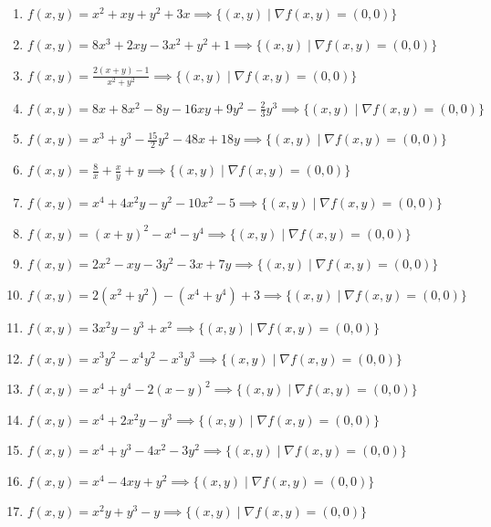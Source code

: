 \documentclass[11pt,a4paper]{article}
\begin{document}
\begin{enumerate}
\item $\displaystyle f(x, y) = x^{2} + xy + y^{2} + 3x \implies \{(x, y) \mid \nabla f(x, y) = (0, 0)\}$
\item $\displaystyle f(x, y) = 8x^{3} + 2xy - 3x^{2} + y^{2} + 1 \implies \{(x, y) \mid \nabla f(x, y) = (0, 0)\}$
\item $\displaystyle f(x, y) = \frac{2(x + y) - 1}{x^{2} + y^{2}} \implies \{(x, y) \mid \nabla f(x, y) = (0, 0)\}$
\item $\displaystyle f(x, y) = 8x + 8x^{2} - 8y - 16xy + 9y^{2} - \frac{2}{3} y^{3} \implies \{(x, y) \mid \nabla f(x, y) = (0, 0)\}$
\item $\displaystyle f(x, y) = x^{3} + y^{3} - \frac{15}{2} y^{2} - 48x + 18y \implies \{(x, y) \mid \nabla f(x, y) = (0, 0)\}$
\item $\displaystyle f(x, y) = \frac{8}{x} + \frac{x}{y} + y \implies \{(x, y) \mid \nabla f(x, y) = (0, 0)\}$
\item $\displaystyle f(x, y) = x^{4} + 4x^{2} y - y^{2} - 10x^{2} - 5 \implies \{(x, y) \mid \nabla f(x, y) = (0, 0)\}$
\item $\displaystyle f(x, y) = (x + y)^{2} - x^{4} - y^{4} \implies \{(x, y) \mid \nabla f(x, y) = (0, 0)\}$
\item $\displaystyle f(x, y) = 2x^{2} - xy - 3y^{2} - 3x + 7y \implies \{(x, y) \mid \nabla f(x, y) = (0, 0)\}$
\item $\displaystyle f(x, y) = 2(x^{2} + y^{2}) - (x^{4} + y^{4}) + 3 \implies \{(x, y) \mid \nabla f(x, y) = (0, 0)\}$
\item $\displaystyle f(x, y) = 3x^{2} y - y^{3} + x^{2} \implies \{(x, y) \mid \nabla f(x, y) = (0, 0)\}$
\item $\displaystyle f(x, y) = x^{3} y^{2} - x^{4} y^{2} - x^{3} y^{3} \implies \{(x, y) \mid \nabla f(x, y) = (0, 0)\}$
\item $\displaystyle f(x, y) = x^{4} + y^{4} - 2(x - y)^{2} \implies \{(x, y) \mid \nabla f(x, y) = (0, 0)\}$
\item $\displaystyle f(x, y) = x^{4} + 2x^{2} y - y^{3} \implies \{(x, y) \mid \nabla f(x, y) = (0, 0)\}$
\item $\displaystyle f(x, y) = x^{4} + y^{3} - 4x^{2} - 3y^{2} \implies \{(x, y) \mid \nabla f(x, y) = (0, 0)\}$
\item $\displaystyle f(x, y) = x^{4} - 4xy + y^{2} \implies \{(x, y) \mid \nabla f(x, y) = (0, 0)\}$
\item $\displaystyle f(x, y) = x^{2} y + y^{3} - y \implies \{(x, y) \mid \nabla f(x, y) = (0, 0)\}$

\end{enumerate}
\end{document}
